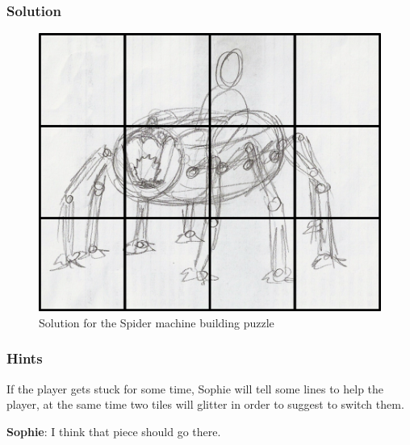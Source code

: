 \subsubsection*{Solution}
\begin{figure}[H]
  \centering
  \includegraphics[width=\textwidth]{Images/Puzzles/machineSolution}
  \caption{Solution for the Spider machine building puzzle}
\end{figure}


\subsubsection*{Hints}
If the player gets stuck for some time, Sophie will tell some lines to help the player, at the same time two tiles will glitter in order to suggest to switch them.

\textbf{Sophie}: I think that piece should go there.

